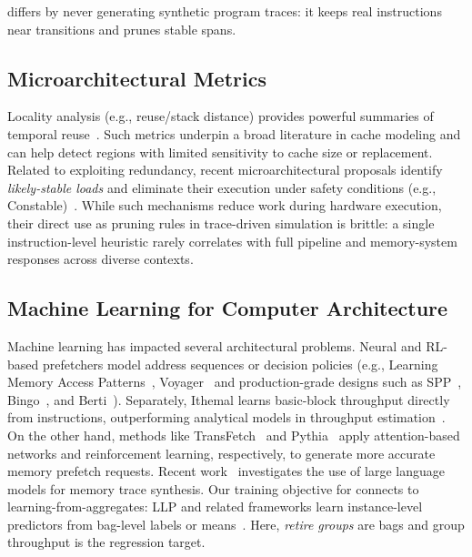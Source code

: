 \name differs by never generating synthetic program traces: it keeps real instructions near transitions and prunes stable spans.

\subsection{Microarchitectural Metrics}
Locality analysis (e.g., reuse/stack distance) provides powerful summaries of temporal reuse~\cite{mattson70, locality_theory}. Such metrics underpin a broad literature in cache modeling and can help detect regions with limited sensitivity to cache size or replacement. Related to exploiting redundancy, recent microarchitectural proposals identify \emph{likely-stable loads} and eliminate their execution under safety conditions (e.g., Constable)~\cite{constable}. While such mechanisms reduce work during hardware execution, their direct use as pruning rules in trace-driven simulation is brittle: a single instruction-level heuristic rarely correlates with full pipeline and memory-system responses across diverse contexts. 

\subsection{Machine Learning for Computer Architecture}
Machine learning has impacted several architectural problems. Neural and RL-based prefetchers model address sequences or decision policies (e.g., Learning Memory Access Patterns~\cite{hashemi2018learning}, Voyager~\cite{voyager} and production-grade designs such as SPP~\cite{spp-micro16}, Bingo~\cite{bingo-hpca19}, and Berti~\cite{berti-micro22}). Separately, Ithemal learns basic-block throughput directly from instructions, outperforming analytical models in throughput estimation~\cite{mendelson1997speculative}. 
On the other hand, methods like TransFetch~\cite{transfetch} and Pythia~\cite{pythia21} apply attention-based networks and reinforcement learning, respectively, to generate more accurate memory prefetch requests. Recent work~\cite{mine} investigates the use of large language models for memory trace synthesis.
Our training objective for \pts connects to learning-from-aggregates: LLP and related frameworks learn instance-level predictors from bag-level labels or means~\cite{yu2014-llp,scott2020-llp,law2018-agg,zhang2020-agg}. Here, \emph{retire groups} are bags and group throughput is the regression target.
 

